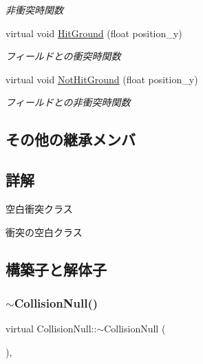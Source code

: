 \begin{DoxyCompactItemize}
\begin{DoxyCompactList}\small\item\em 非衝突時関数 \end{DoxyCompactList}\item 
virtual void \mbox{\hyperlink{class_collision_null_a75900c2cec4e49336701e2e3c64e5bfe}{Hit\+Ground}} (float position\+\_\+y)
\begin{DoxyCompactList}\small\item\em フィールドとの衝突時関数 \end{DoxyCompactList}\item 
virtual void \mbox{\hyperlink{class_collision_null_ad456a03a3e3d55d8d408b7ed28ce7911}{Not\+Hit\+Ground}} (float position\+\_\+y)
\begin{DoxyCompactList}\small\item\em フィールドとの非衝突時関数 \end{DoxyCompactList}\end{DoxyCompactItemize}
\subsection*{その他の継承メンバ}


\subsection{詳解}
空白衝突クラス 

衝突の空白クラス 

\subsection{構築子と解体子}
\mbox{\label{class_collision_null_a2eaef584b2ae2c4062df8bf3a6533fb3}} 
\subsubsection{\texorpdfstring{$\sim$\+Collision\+Null()}{~CollisionNull()}}
{\footnotesize\ttfamily virtual Collision\+Null\+::$\sim$\+Collision\+Null (\begin{DoxyParamCaption}{ }\end{DoxyParamCaption})\hspace{0.3cm}{\ttfamily [inline]}, {\ttfamily [virtual]}}



